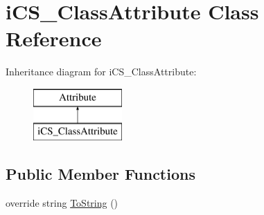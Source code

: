 \hypertarget{classi_c_s___class_attribute}{\section{i\+C\+S\+\_\+\+Class\+Attribute Class Reference}
\label{classi_c_s___class_attribute}
}
Inheritance diagram for i\+C\+S\+\_\+\+Class\+Attribute\+:\begin{figure}[H]
\begin{center}
\leavevmode
\includegraphics[height=2.000000cm]{classi_c_s___class_attribute}
\end{center}
\end{figure}
\subsection*{Public Member Functions}
\begin{DoxyCompactItemize}
\item 
override string \hyperlink{classi_c_s___class_attribute_a9bbd749bd3021999835a579a427ae5b8}{To\+String} ()
\end{DoxyCompactItemize}
